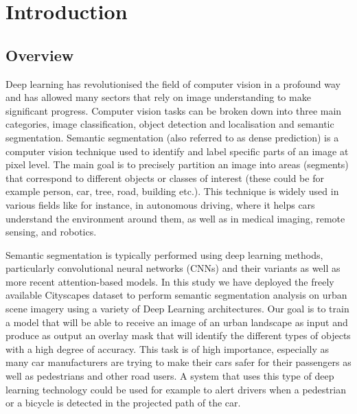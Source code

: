 \section{Introduction}
\subsection{Overview}

Deep learning has revolutionised the field of computer vision in a profound way and has allowed many sectors that rely on image understanding to make significant progress. Computer vision tasks can be broken down into three main categories, image classification, object detection and localisation and semantic segmentation. Semantic segmentation (also referred to as dense prediction) is a computer vision technique used to identify and label specific parts of an image at pixel level. The main goal is to precisely partition an image into areas (segments) that correspond to different objects or classes of interest (these could be for example person, car, tree, road, building etc.). This technique is widely used in various fields like for instance, in autonomous driving, where it helps cars understand the  environment around them, as well as in medical imaging, remote sensing, and robotics. 

Semantic segmentation is typically performed using deep learning methods, particularly convolutional neural networks (CNNs) and their variants as well as more recent attention-based models. In this study we have deployed the freely available Cityscapes dataset \cite{DBLP:journals/corr/CordtsORREBFRS16} to perform semantic segmentation analysis on urban scene imagery using a variety of Deep Learning architectures. Our goal is to train a model that will be able to receive an image of an urban landscape as input and produce as output an overlay mask that will identify the different types of objects with a high degree of accuracy. This task is of high importance, especially as many car manufacturers are trying to make their cars safer for their passengers as well as pedestrians and other road users. A system that uses this type of deep learning technology could be used for example to alert drivers when a pedestrian or a bicycle is detected in the projected path of the car. 
